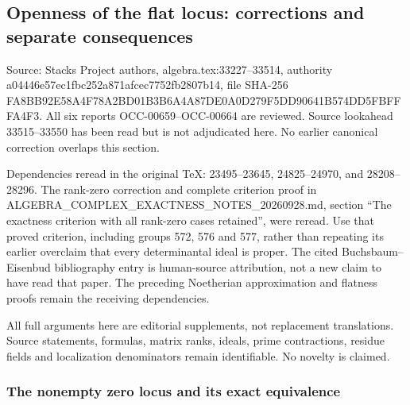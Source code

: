 \subsection{Openness of the flat locus: corrections and separate consequences}\label{algebra-proof-039-openness-of-the-flat-locus-corrections-and-separate-consequences}

Source: Stacks Project authors, algebra.\AlgebraIdentifierBreak{}tex:\AlgebraIdentifierBreak{}33227--\AlgebraIdentifierBreak{}33514, authority a044\allowbreak{}46e5\allowbreak{}7ec1\allowbreak{}fbc2\allowbreak{}52a8\allowbreak{}71af\allowbreak{}cec7\allowbreak{}752f\allowbreak{}b280\allowbreak{}7b14, file SHA-256 FA8B\allowbreak{}B92E\allowbreak{}58A4\allowbreak{}F78A\allowbreak{}2BD0\allowbreak{}1B3B\allowbreak{}6A4A\allowbreak{}87DE\allowbreak{}0A0D\allowbreak{}279F\allowbreak{}5DD9\allowbreak{}0641\allowbreak{}B574\allowbreak{}DD5F\allowbreak{}BFFF\allowbreak{}A4F3. All six reports OCC-\AlgebraIdentifierBreak{}00659--\AlgebraIdentifierBreak{}OCC-\AlgebraIdentifierBreak{}00664 are reviewed. Source lookahead 33515--33550 has been read but is not adjudicated here. No earlier canonical correction overlaps this section.

Dependencies reread in the original TeX: 23495--23645, 24825--24970, and 28208--28296. The rank-zero correction and complete criterion proof in ALGEBRA\_\allowbreak{}COMPLEX\_\allowbreak{}EXACTNESS\_\allowbreak{}NOTES\_\allowbreak{}20260928.\allowbreak{}md, section ``The exactness criterion with all rank-zero cases retained'', were reread. Use that proved criterion, including groups 572, 576 and 577, rather than repeating its earlier overclaim that every determinantal ideal is proper. The cited Buchsbaum--Eisenbud bibliography entry is human-source attribution, not a new claim to have read that paper. The preceding Noetherian approximation and flatness proofs remain the receiving dependencies.

All full arguments here are editorial supplements, not replacement translations. Source statements, formulas, matrix ranks, ideals, prime contractions, residue fields and localization denominators remain identifiable. No novelty is claimed.

\subsubsection{The nonempty zero locus and its exact equivalence}\label{algebra-proof-039-the-nonempty-zero-locus-and-its-exact-equivalence}

